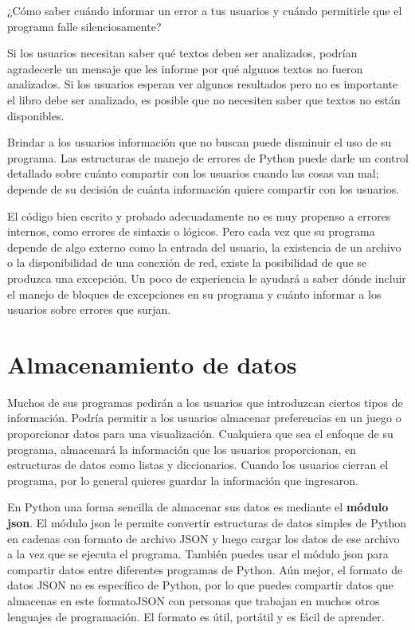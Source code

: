 ¿Cómo saber cuándo informar un error a tus usuarios y cuándo permitirle que el programa falle silenciosamente? 

Si los usuarios necesitan saber qué textos  deben ser analizados, podrían agradecerle un mensaje que les informe por qué algunos textos
no fueron analizados. Si los usuarios esperan ver algunos resultados pero no es importante el 
libro debe ser analizado, es posible que no necesiten saber que  textos no están disponibles. 

Brindar a los usuarios información que no buscan puede disminuir el uso de su programa. 
Las estructuras de manejo de errores de Python puede darle un control detallado sobre cuánto compartir con los usuarios cuando
las cosas van mal; depende de su  decisión de  cuánta información quiere compartir con los usuarios.

El código bien escrito y probado adecuadamente no es muy propenso a errores internos, como errores de sintaxis o lógicos. Pero cada vez que su programa depende de algo externo como la entrada del usuario, la existencia de un archivo o la disponibilidad de una conexión de red, existe la posibilidad de que se produzca una excepción.
Un poco de experiencia le ayudará a saber dónde incluir el manejo de bloques de excepciones en su programa
y cuánto informar a los usuarios sobre errores que surjan.


\section{Almacenamiento de datos}

Muchos de sus programas pedirán a los usuarios que introduzcan ciertos tipos de información.
Podría permitir a los usuarios almacenar preferencias en un juego o proporcionar datos para una visualización.
Cualquiera que sea el enfoque de su programa, almacenará la información que los usuarios proporcionan, en estructuras de datos como listas y diccionarios. Cuando los usuarios cierran el programa, por lo general  quieres guardar la información que ingresaron. 

En Python una forma sencilla de almacenar sus datos es mediante el {\bf módulo {\ttfamily json}}. El  módulo {\ttfamily json} le permite convertir estructuras de datos simples de Python en cadenas con formato de archivo {\ttfamily JSON} y luego cargar los datos de ese archivo a la vez que se ejecuta el programa. También puedes usar el módulo {\ttfamily json}  para compartir datos entre diferentes programas de Python. Aún mejor, el formato de datos {\ttfamily JSON} no es específico de Python, por lo que puedes compartir datos que almacenas en este  formato{\ttfamily JSON} con personas que trabajan en muchos otros lenguajes de programación. El formato es útil, portátil  y es fácil de aprender.


